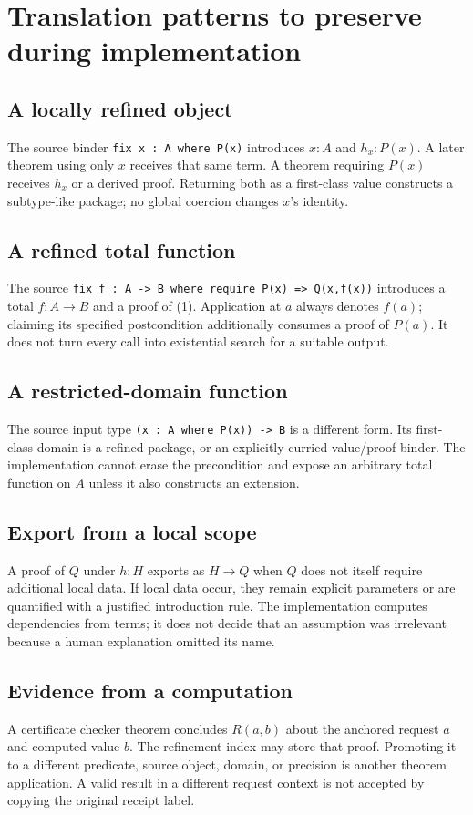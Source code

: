\documentclass[11pt,letterpaper]{article}
\newcommand{\code}[1]{\nolinkurl{#1}}
\theoremstyle{definition}
\theoremstyle{remark}
\begin{document}
\section{Translation patterns to preserve during implementation}\label{app:translations}

\subsection*{A locally refined object}
The source binder \code{fix x : A where P(x)} introduces $x:A$ and $h_x:P(x)$.
A later theorem using only $x$ receives that same term. A theorem requiring
$P(x)$ receives $h_x$ or a derived proof. Returning both as a first-class value
constructs a subtype-like package; no global coercion changes $x$'s identity.

\subsection*{A refined total function}
The source \code{fix f : A -> B where require P(x) => Q(x,f(x))} introduces a
total $f:A\to B$ and a proof of (1). Application at $a$ always denotes $f(a)$;
claiming its specified postcondition additionally consumes a proof of $P(a)$.
It does not turn every call into existential search for a suitable output.

\subsection*{A restricted-domain function}
The source input type \code{(x : A where P(x)) -> B} is a different form. Its
first-class domain is a refined package, or an explicitly curried value/proof
binder. The implementation cannot erase the precondition and expose an
arbitrary total function on $A$ unless it also constructs an extension.

\subsection*{Export from a local scope}
A proof of $Q$ under $h:H$ exports as $H\to Q$ when $Q$ does not itself require
additional local data. If local data occur, they remain explicit parameters or
are quantified with a justified introduction rule. The implementation computes
dependencies from terms; it does not decide that an assumption was irrelevant
because a human explanation omitted its name.

\subsection*{Evidence from a computation}
A certificate checker theorem concludes $R(a,b)$ about the anchored request $a$
and computed value $b$. The refinement index may store that proof. Promoting it
to a different predicate, source object, domain, or precision is another theorem
application. A valid result in a different request context is not accepted by
copying the original receipt label.
\end{document}
